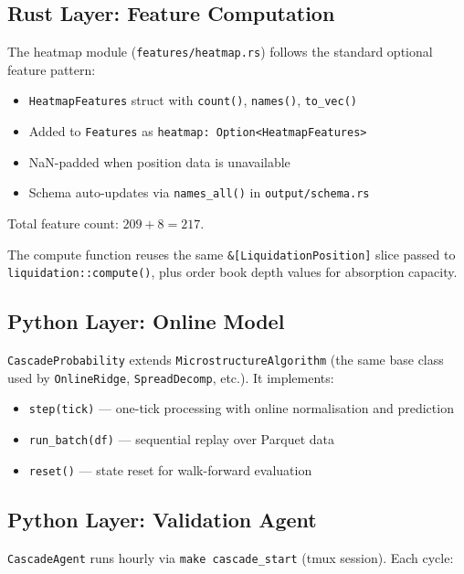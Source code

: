 \documentclass[11pt,a4paper]{article}
\begin{document}
\subsection{Rust Layer: Feature Computation}

The heatmap module (\texttt{features/heatmap.rs}) follows the standard optional feature pattern:

\begin{itemize}
    \item \texttt{HeatmapFeatures} struct with \texttt{count()}, \texttt{names()}, \texttt{to\_vec()}
    \item Added to \texttt{Features} as \texttt{heatmap: Option<HeatmapFeatures>}
    \item NaN-padded when position data is unavailable
    \item Schema auto-updates via \texttt{names\_all()} in \texttt{output/schema.rs}
\end{itemize}

Total feature count: $209 + 8 = 217$.

The compute function reuses the same \texttt{\&[LiquidationPosition]} slice passed to \texttt{liquidation::compute()}, plus order book depth values for absorption capacity.

\subsection{Python Layer: Online Model}

\texttt{CascadeProbability} extends \texttt{MicrostructureAlgorithm} (the same base class used by \texttt{OnlineRidge}, \texttt{SpreadDecomp}, etc.). It implements:

\begin{itemize}
    \item \texttt{step(tick)} --- one-tick processing with online normalisation and prediction
    \item \texttt{run\_batch(df)} --- sequential replay over Parquet data
    \item \texttt{reset()} --- state reset for walk-forward evaluation
\end{itemize}

\subsection{Python Layer: Validation Agent}

\texttt{CascadeAgent} runs hourly via \texttt{make cascade\_start} (tmux session). Each cycle:
\end{document}
